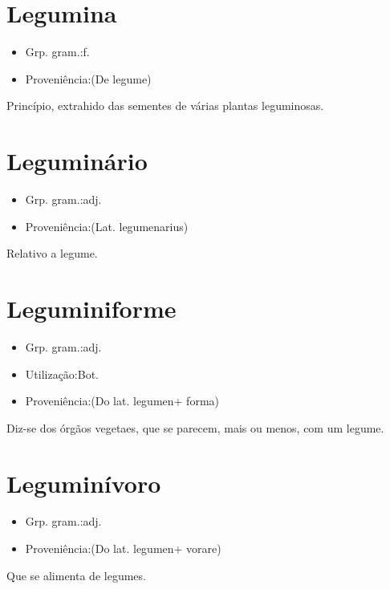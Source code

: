\section{Legumina}
\begin{itemize}
\item {Grp. gram.:f.}
\end{itemize}
\begin{itemize}
\item {Proveniência:(De \textunderscore legume\textunderscore )}
\end{itemize}
Princípio, extrahido das sementes de várias plantas leguminosas.
\section{Leguminário}
\begin{itemize}
\item {Grp. gram.:adj.}
\end{itemize}
\begin{itemize}
\item {Proveniência:(Lat. \textunderscore legumenarius\textunderscore )}
\end{itemize}
Relativo a legume.
\section{Leguminiforme}
\begin{itemize}
\item {Grp. gram.:adj.}
\end{itemize}
\begin{itemize}
\item {Utilização:Bot.}
\end{itemize}
\begin{itemize}
\item {Proveniência:(Do lat. \textunderscore legumen\textunderscore  + \textunderscore forma\textunderscore )}
\end{itemize}
Diz-se dos órgãos vegetaes, que se parecem, mais ou menos, com um legume.
\section{Leguminívoro}
\begin{itemize}
\item {Grp. gram.:adj.}
\end{itemize}
\begin{itemize}
\item {Proveniência:(Do lat. \textunderscore legumen\textunderscore  + \textunderscore vorare\textunderscore )}
\end{itemize}
Que se alimenta de legumes.
